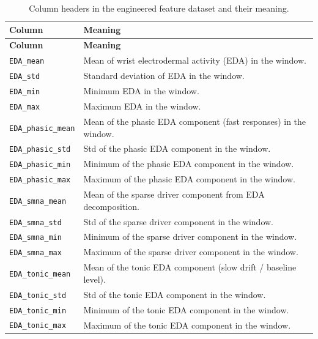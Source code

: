 \documentclass[11pt]{article}
\begin{document}
\renewcommand{\arraystretch}{1.1}
\begin{longtable}{@{}p{}p{}@{}}
\caption{\label{tab:columns}Column headers in the engineered feature dataset and their meaning.}\\
\toprule
\textbf{Column} & \textbf{Meaning} \\
\midrule
\endfirsthead
\toprule
\textbf{Column} & \textbf{Meaning} \\
\midrule
\endhead
\bottomrule
\endfoot

\texttt{EDA\_mean} & Mean of wrist electrodermal activity (EDA) in the window. \\
\texttt{EDA\_std} & Standard deviation of EDA in the window. \\
\texttt{EDA\_min} & Minimum EDA in the window. \\
\texttt{EDA\_max} & Maximum EDA in the window. \\

\texttt{EDA\_phasic\_mean} & Mean of the phasic EDA component (fast responses) in the window. \\
\texttt{EDA\_phasic\_std} & Std of the phasic EDA component in the window. \\
\texttt{EDA\_phasic\_min} & Minimum of the phasic EDA component in the window. \\
\texttt{EDA\_phasic\_max} & Maximum of the phasic EDA component in the window. \\

\texttt{EDA\_smna\_mean} & Mean of the sparse driver component from EDA decomposition. \\
\texttt{EDA\_smna\_std} & Std of the sparse driver component in the window. \\
\texttt{EDA\_smna\_min} & Minimum of the sparse driver component in the window. \\
\texttt{EDA\_smna\_max} & Maximum of the sparse driver component in the window. \\

\texttt{EDA\_tonic\_mean} & Mean of the tonic EDA component (slow drift / baseline level). \\
\texttt{EDA\_tonic\_std} & Std of the tonic EDA component in the window. \\
\texttt{EDA\_tonic\_min} & Minimum of the tonic EDA component in the window. \\
\texttt{EDA\_tonic\_max} & Maximum of the tonic EDA component in the window. \\


\end{longtable}
\end{document}
